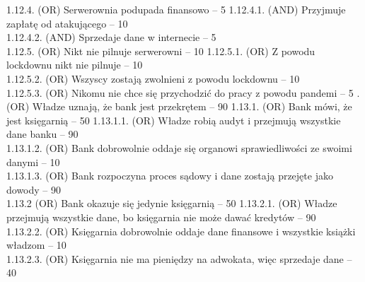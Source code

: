 \documentclass[10pt,a4paper,twoside]{article}
\newenvironment{subs}
{\adjustwidth{3em}{0pt}}
{\endadjustwidth}
\begin{document}
\begin{subs}
\begin{subs}
            1.12.4. (OR) Serwerownia podupada finansowo -- 5
            \begin{subs}
                1.12.4.1. (AND) Przyjmuje zapłatę od atakującego -- 10 \\
                1.12.4.2. (AND) Sprzedaje dane w internecie -- 5 \\
            \end{subs}
            1.12.5. (OR) Nikt nie pilnuje serwerowni -- 10
            \begin{subs}
                1.12.5.1. (OR) Z powodu lockdownu nikt nie pilnuje -- 10 \\
                1.12.5.2. (OR) Wszyscy zostają zwolnieni z powodu lockdownu -- 10 \\
                1.12.5.3. (OR) Nikomu nie chce się przychodzić do pracy z powodu pandemi -- 5
            \end{subs}
        \end{subs}
        1.13. (OR) Władze uznają, że bank jest przekrętem -- 90
        \begin{subs}
            1.13.1. (OR) Bank mówi, że jest księgarnią -- 50
            \begin{subs}
                1.13.1.1. (OR) Władze robią audyt i przejmują wszystkie dane banku -- 90 \\
                1.13.1.2. (OR) Bank dobrowolnie oddaje się organowi sprawiedliwości ze swoimi danymi -- 10 \\
                1.13.1.3. (OR) Bank rozpoczyna proces sądowy i dane zostają przejęte jako dowody -- 90 \\
            \end{subs}
            1.13.2 (OR) Bank okazuje się jedynie księgarnią -- 50
            \begin{subs}
                1.13.2.1. (OR) Władze przejmują wszystkie dane, bo księgarnia nie może dawać kredytów -- 90 \\
                1.13.2.2. (OR) Księgarnia dobrowolnie oddaje dane finansowe i wszystkie książki władzom -- 10 \\
                1.13.2.3. (OR) Księgarnia nie ma pieniędzy na adwokata, więc sprzedaje dane -- 40
            \end{subs}
        \end{subs}
    \end{subs}
\end{document}
